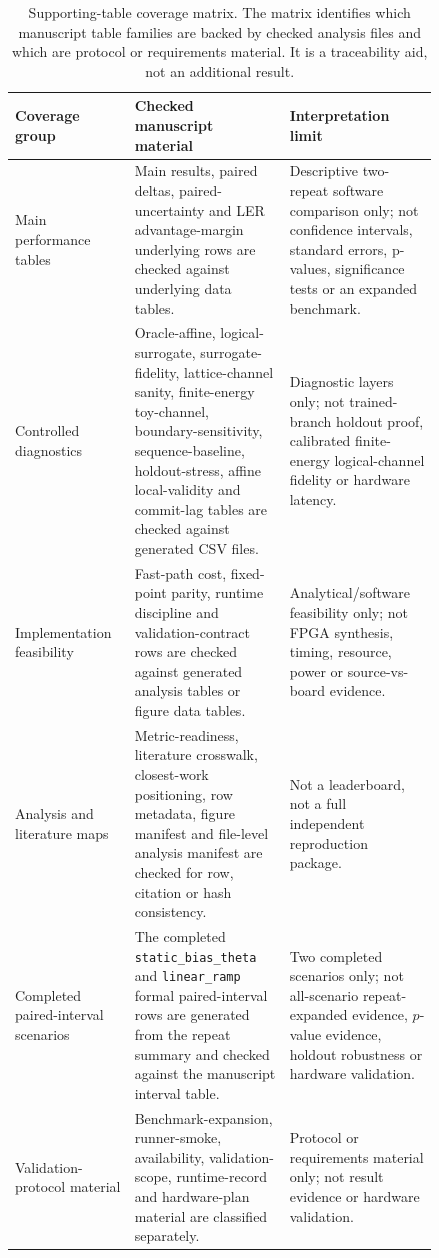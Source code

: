\documentclass[11pt]{article}
\begin{document}
\begin{table}[htbp]
\centering
\scriptsize
\setlength{\tabcolsep}{3pt}
\begin{tabular}{@{}>{\raggedright\arraybackslash}p{0.20\linewidth}>{\raggedright\arraybackslash}p{0.33\linewidth}>{\raggedright\arraybackslash}p{0.31\linewidth}@{}}
\toprule
Coverage group & Checked manuscript material & Interpretation limit \\
\midrule
Main performance tables & Main results, paired deltas, paired-uncertainty and LER advantage-margin underlying rows are checked against underlying data tables. & Descriptive two-repeat software comparison only; not confidence intervals, standard errors, p-values, significance tests or an expanded benchmark. \\
\addlinespace
Controlled diagnostics & Oracle-affine, logical-surrogate, surrogate-fidelity, lattice-channel sanity, finite-energy toy-channel, boundary-sensitivity, sequence-baseline, holdout-stress, affine local-validity and commit-lag tables are checked against generated CSV files. & Diagnostic layers only; not trained-branch holdout proof, calibrated finite-energy logical-channel fidelity or hardware latency. \\
\addlinespace
Implementation feasibility & Fast-path cost, fixed-point parity, runtime discipline and validation-contract rows are checked against generated analysis tables or figure data tables. & Analytical/software feasibility only; not FPGA synthesis, timing, resource, power or source-vs-board evidence. \\
\addlinespace
Analysis and literature maps & Metric-readiness, literature crosswalk, closest-work positioning, row metadata, figure manifest and file-level analysis manifest are checked for row, citation or hash consistency. & Not a leaderboard, not a full independent reproduction package. \\
\addlinespace
Completed paired-interval scenarios & The completed \texttt{static\_bias\_theta} and \texttt{linear\_ramp} formal paired-interval rows are generated from the repeat summary and checked against the manuscript interval table. & Two completed scenarios only; not all-scenario repeat-expanded evidence, \(p\)-value evidence, holdout robustness or hardware validation. \\
\addlinespace
Validation-protocol material & Benchmark-expansion, runner-smoke, availability,
validation-scope, runtime-record and hardware-plan material are classified
separately. & Protocol or requirements material only; not result evidence or
hardware validation. \\
\bottomrule
\end{tabular}
\caption{Supporting-table coverage matrix.  The matrix identifies which
manuscript table families are backed by checked analysis files and which are
protocol or requirements material.  It is a traceability aid, not an additional
result.}
\label{tab:supporting-coverage-matrix}
\end{table}
\end{document}
